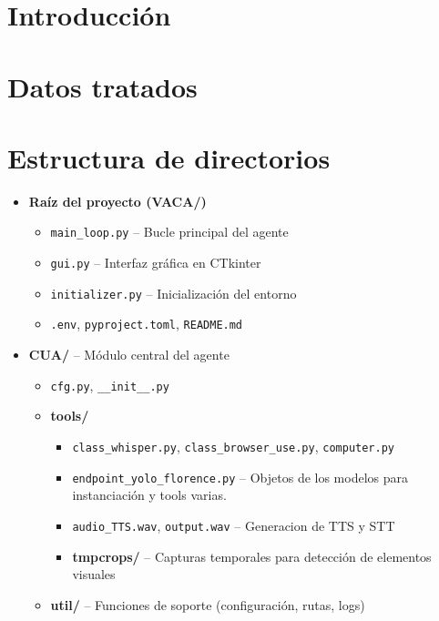 
\section{Introducción}

\section{Datos tratados}


\section{Estructura de directorios}

\begin{itemize}
  \item \textbf{Raíz del proyecto (VACA/)}
  \begin{itemize}
    \item \texttt{main\_loop.py} -- Bucle principal del agente
    \item \texttt{gui.py} -- Interfaz gráfica en CTkinter
    \item \texttt{initializer.py} -- Inicialización del entorno
    \item \texttt{.env}, \texttt{pyproject.toml}, \texttt{README.md}
  \end{itemize}
  
  \item \textbf{CUA/} -- Módulo central del agente
  \begin{itemize}
    \item \texttt{cfg.py}, \texttt{\_\_init\_\_.py}
    \item \textbf{tools/}
    \begin{itemize}
      \item \texttt{class\_whisper.py}, \texttt{class\_browser\_use.py}, \texttt{computer.py}
      \item \texttt{endpoint\_yolo\_florence.py} -- Objetos de los modelos para instanciación y tools varias.
      \item \texttt{audio\_TTS.wav}, \texttt{output.wav} -- Generacion de TTS y STT
      \item \textbf{tmpcrops/} -- Capturas temporales para detección de elementos visuales
    \end{itemize}
    \item \textbf{util/} -- Funciones de soporte (configuración, rutas, logs)
  \end{itemize}


\end{itemize}
